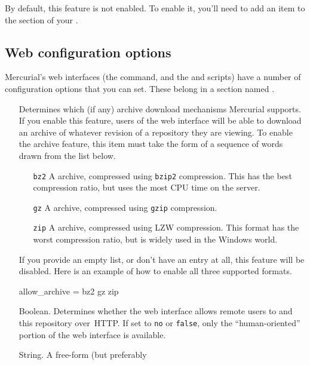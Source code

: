By default, this feature is not enabled.  To enable it, you'll need to
add an  item to the 
section of your \hgrc.

\subsection{Web configuration options}

Mercurial's web interfaces (the  command, and the
 and  scripts) have a
number of configuration options that you can set.  These belong in a
section named .
\begin{itemize}
\item[\rcitem{web}{allow\_archive}] Determines which (if any) archive
  download mechanisms Mercurial supports.  If you enable this
  feature, users of the web interface will be able to download an
  archive of whatever revision of a repository they are viewing.
  To enable the archive feature, this item must take the form of a
  sequence of words drawn from the list below.
  \begin{itemize}
  \item[\texttt{bz2}] A  archive, compressed using
    \texttt{bzip2} compression.  This has the best compression ratio,
    but uses the most CPU time on the server.
  \item[\texttt{gz}] A  archive, compressed using
    \texttt{gzip} compression.
  \item[\texttt{zip}] A  archive, compressed using LZW
    compression.  This format has the worst compression ratio, but is
    widely used in the Windows world.
  \end{itemize}
  If you provide an empty list, or don't have an
   entry at all, this feature will be
  disabled.  Here is an example of how to enable all three supported
  formats.
  \begin{codesample4}
    [web]
    allow_archive = bz2 gz zip
  \end{codesample4}
\item[\rcitem{web}{allowpull}] Boolean.  Determines whether the web
  interface allows remote users to  and  this
  repository over~HTTP.  If set to \texttt{no} or \texttt{false}, only
  the ``human-oriented'' portion of the web interface is available.
\item[\rcitem{web}{contact}] String.  A free-form (but preferably

\end{itemize}
